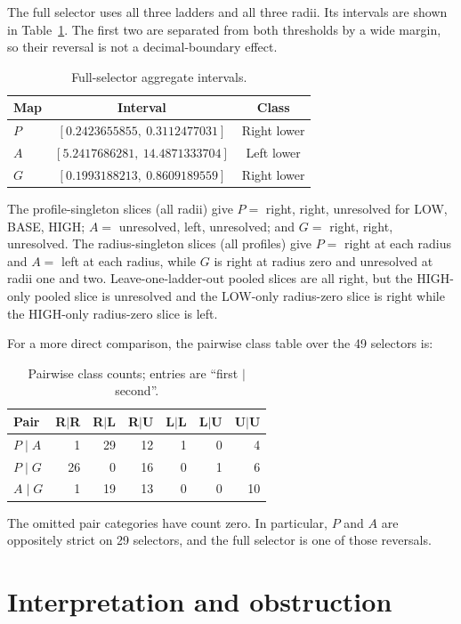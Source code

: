 \documentclass[10pt,a4paper]{article}
\begin{document}
The full selector uses all three ladders and all three radii.  Its intervals are
shown in Table~\ref{tab:full}.  The first two are separated from both
thresholds by a wide margin, so their reversal is not a decimal-boundary
effect.

\begin{table}[t]
\centering\small
\caption{Full-selector aggregate intervals.}
\label{tab:full}
\begin{tabular}{lcc}
\toprule
Map & Interval & Class\\
\midrule
$P$ & $[0.2423655855,\ 0.3112477031]$ & Right lower\\
$A$ & $[5.2417686281,\ 14.4871333704]$ & Left lower\\
$G$ & $[0.1993188213,\ 0.8609189559]$ & Right lower\\
\bottomrule
\end{tabular}
\end{table}

The profile-singleton slices (all radii) give $P=$ right, right, unresolved
for LOW, BASE, HIGH; $A=$ unresolved, left, unresolved; and $G=$ right,
right, unresolved.  The radius-singleton slices (all profiles) give $P=$ right
at each radius and $A=$ left at each radius, while $G$ is right at radius zero
and unresolved at radii one and two.  Leave-one-ladder-out pooled slices are
all right, but the HIGH-only pooled slice is unresolved and the LOW-only
radius-zero slice is right while the HIGH-only radius-zero slice is left.

For a more direct comparison, the pairwise class table over the 49 selectors is:
\begin{table}[t]
\centering\small
\caption{Pairwise class counts; entries are ``first $\mid$ second''.}
\label{tab:pairs}
\begin{tabular}{lrrrrrr}
\toprule
Pair & R$\mid$R & R$\mid$L & R$\mid$U & L$\mid$L & L$\mid$U & U$\mid$U\\
\midrule
$P\mid A$ & 1 & 29 & 12 & 1 & 0 & 4\\
$P\mid G$ & 26 & 0 & 16 & 0 & 1 & 6\\
$A\mid G$ & 1 & 19 & 13 & 0 & 0 & 10\\
\bottomrule
\end{tabular}
\end{table}
The omitted pair categories have count zero.  In particular, $P$ and $A$
are oppositely strict on 29 selectors, and the full selector is one of those
reversals.

\section{Interpretation and obstruction}
\end{document}

